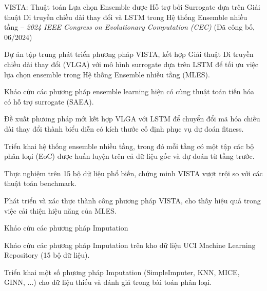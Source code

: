 \begin{cventries}

  \cventry
    {VISTA: Thuật toán Lựa chọn Ensemble được Hỗ trợ bởi Surrogate dựa trên Giải thuật Di truyền chiều dài thay đổi và LSTM trong Hệ thống Ensemble nhiều tầng -- \emph{2024 IEEE Congress on Evolutionary Computation (CEC)} (Đã công bố, 06/2024)}
    {}
    {
      \begin{cvitems}
        \item {Dự án tập trung phát triển phương pháp VISTA, kết hợp Giải thuật Di truyền chiều dài thay đổi (VLGA) với mô hình surrogate dựa trên LSTM để tối ưu việc lựa chọn ensemble trong Hệ thống Ensemble nhiều tầng (MLES).}
        \item {Khảo cứu các phương pháp ensemble learning hiện có cùng thuật toán tiến hóa có hỗ trợ surrogate (SAEA).}
        \item {Đề xuất phương pháp mới kết hợp VLGA với LSTM để chuyển đổi mã hóa chiều dài thay đổi thành biểu diễn có kích thước cố định phục vụ dự đoán fitness.}
        \item {Triển khai hệ thống ensemble nhiều tầng, trong đó mỗi tầng có một tập các bộ phân loại (EoC) được huấn luyện trên cả dữ liệu gốc và dự đoán từ tầng trước.}
        \item {Thực nghiệm trên 15 bộ dữ liệu phổ biến, chứng minh VISTA vượt trội so với các thuật toán benchmark.}
        \item {Phát triển và xác thực thành công phương pháp VISTA, cho thấy hiệu quả trong việc cải thiện hiệu năng của MLES.}
      \end{cvitems}
    }

\vspace{8pt}

  \cventry
    {Khảo cứu các phương pháp Imputation}
    {}
    {
      \begin{cvitems}
        \item {Khảo cứu các phương pháp Imputation trên kho dữ liệu UCI Machine Learning Repository (15 bộ dữ liệu).}
        \item {Triển khai một số phương pháp Imputation (SimpleImputer, KNN, MICE, GINN, ...) cho dữ liệu thiếu và đánh giá trong bài toán phân loại.}
      \end{cvitems}
    }

\end{cventries}

\vspace{10pt}

